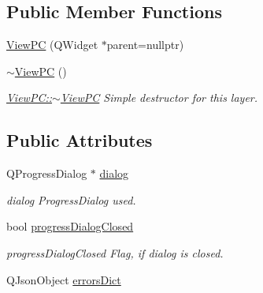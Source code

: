 \subsection*{Public Member Functions}
\begin{DoxyCompactItemize}
\item 
\hyperlink{class_view_p_c_a33c96c61f61042319c66c19059836b7f}{View\-P\-C} (Q\-Widget $\ast$parent=nullptr)
\item 
\hyperlink{class_view_p_c_a91c51f5c1e6ed5ab12b410339f469b0f}{$\sim$\-View\-P\-C} ()
\begin{DoxyCompactList}\small\item\em \hyperlink{class_view_p_c_a91c51f5c1e6ed5ab12b410339f469b0f}{View\-P\-C\-::$\sim$\-View\-P\-C} Simple destructor for this layer. \end{DoxyCompactList}\end{DoxyCompactItemize}
\subsection*{Public Attributes}
\begin{DoxyCompactItemize}
\item 
Q\-Progress\-Dialog $\ast$ \hyperlink{class_view_p_c_a31abbb470fe329b44e6ffee202b903ca}{dialog}
\begin{DoxyCompactList}\small\item\em dialog Progress\-Dialog used. \end{DoxyCompactList}\item 
bool \hyperlink{class_view_p_c_add8c82aa2b0b934212aa5bde9277ab36}{progress\-Dialog\-Closed}
\begin{DoxyCompactList}\small\item\em progress\-Dialog\-Closed Flag, if dialog is closed. \end{DoxyCompactList}\item 
Q\-Json\-Object \hyperlink{class_view_p_c_a26f90436aca32e5bad46f5e69a7e7e09}{errors\-Dict}
\end{DoxyCompactItemize}
